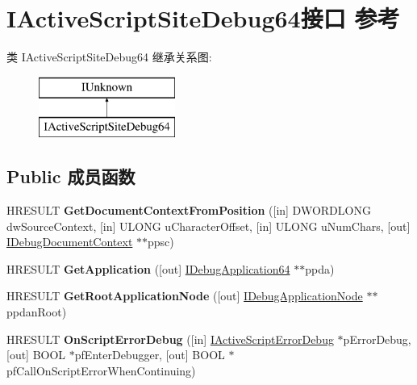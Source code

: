 \hypertarget{interface_i_active_script_site_debug64}{}\section{I\+Active\+Script\+Site\+Debug64接口 参考}
\label{interface_i_active_script_site_debug64}
类 I\+Active\+Script\+Site\+Debug64 继承关系图\+:\begin{figure}[H]
\begin{center}
\leavevmode
\includegraphics[height=2.000000cm]{interface_i_active_script_site_debug64}
\end{center}
\end{figure}
\subsection*{Public 成员函数}
\begin{DoxyCompactItemize}
\item 
\mbox{\label{interface_i_active_script_site_debug64_acbbcfb22140401fe66ba670ddb7cf669}} 
H\+R\+E\+S\+U\+LT {\bfseries Get\+Document\+Context\+From\+Position} (\mbox{[}in\mbox{]} D\+W\+O\+R\+D\+L\+O\+NG dw\+Source\+Context, \mbox{[}in\mbox{]} U\+L\+O\+NG u\+Character\+Offset, \mbox{[}in\mbox{]} U\+L\+O\+NG u\+Num\+Chars, \mbox{[}out\mbox{]} \hyperlink{interface_i_debug_document_context}{I\+Debug\+Document\+Context} $\ast$$\ast$ppsc)
\item 
\mbox{\label{interface_i_active_script_site_debug64_ab6bd7f27061a88905c30f5b330dc4bcb}} 
H\+R\+E\+S\+U\+LT {\bfseries Get\+Application} (\mbox{[}out\mbox{]} \hyperlink{interface_i_debug_application64}{I\+Debug\+Application64} $\ast$$\ast$ppda)
\item 
\mbox{\label{interface_i_active_script_site_debug64_ae1c7137e74014452f3ff8eb74154e9fe}} 
H\+R\+E\+S\+U\+LT {\bfseries Get\+Root\+Application\+Node} (\mbox{[}out\mbox{]} \hyperlink{interface_i_debug_application_node}{I\+Debug\+Application\+Node} $\ast$$\ast$ppdan\+Root)
\item 
\mbox{\label{interface_i_active_script_site_debug64_a0e6630553d05d66709bfd5e8de8cf2f5}} 
H\+R\+E\+S\+U\+LT {\bfseries On\+Script\+Error\+Debug} (\mbox{[}in\mbox{]} \hyperlink{interface_i_active_script_error_debug}{I\+Active\+Script\+Error\+Debug} $\ast$p\+Error\+Debug, \mbox{[}out\mbox{]} B\+O\+OL $\ast$pf\+Enter\+Debugger, \mbox{[}out\mbox{]} B\+O\+OL $\ast$pf\+Call\+On\+Script\+Error\+When\+Continuing)
\end{DoxyCompactItemize}
